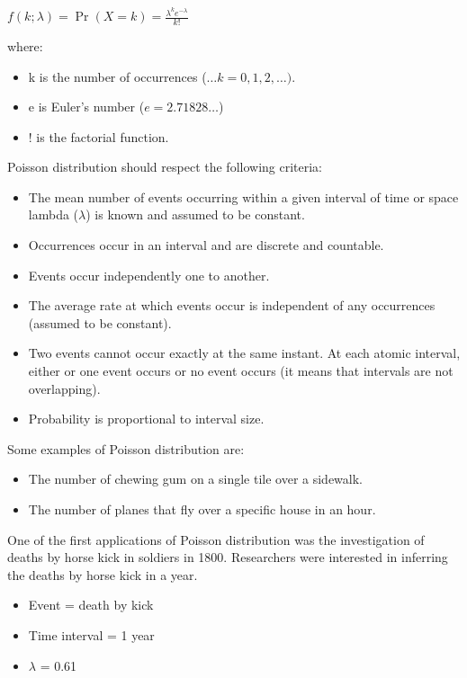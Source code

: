 \documentclass{article}
\begin{document}
$ \displaystyle f(k;\lambda )=\Pr(X{=}k)={\frac {\lambda ^{k}e^{-\lambda }}{k!}} $

where:
\begin{itemize}
    \item k is the number of occurrences ($…k=0,1,2,\ldots) $.
    \item e is Euler's number ($ e=2.71828\ldots$)
    \item ! is the factorial function.
\end{itemize}

Poisson distribution should respect the following criteria:
\begin{itemize}
    \item The mean number of events occurring within a given interval of time or space lambda ($\lambda$) is known and assumed to be constant.
    \item Occurrences occur in an interval and are discrete and countable.
    \item Events occur independently one to another.
    \item The average rate at which events occur is independent of any occurrences (assumed to be constant).
    \item Two events cannot occur exactly at the same instant. At each atomic interval, either or one event occurs or no event occurs (it means that intervals are not overlapping).
    \item Probability is proportional to interval size. 
\end{itemize}

Some examples of Poisson distribution are:
\begin{itemize}
    \item The number of chewing gum on a single tile over a sidewalk. 
    \item The number of planes that fly over a specific house in an hour.
\end{itemize}

One of the first applications of Poisson distribution was the investigation of deaths by horse kick in soldiers in 1800. Researchers were interested in inferring the deaths by horse kick in a year.
\begin{itemize}
    \item Event = death by kick
    \item Time interval = 1 year
    \item $\lambda$ = 0.61
\end{itemize}
\end{document}
